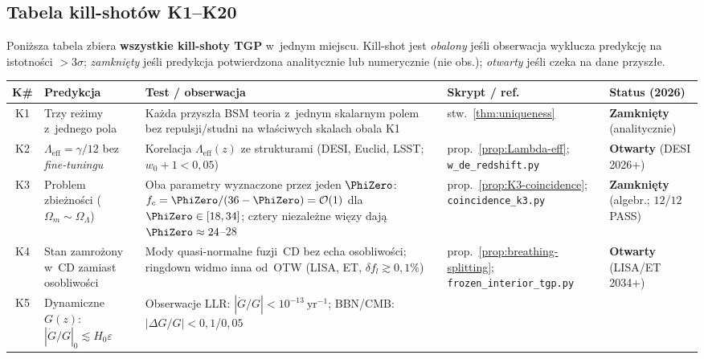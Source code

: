 \subsection{Tabela kill-shot\'ow K1--K20}\label{ssec:killshots}

Poni\.zsza tabela zbiera \textbf{wszystkie kill-shoty TGP} w~jednym miejscu.
Kill-shot jest \emph{obalony} je\'sli obserwacja wyklucza predykcj\k{e} na
istotno\'sci $>3\sigma$; \emph{zamkni\k{e}ty} je\'sli predykcja potwierdzona
analitycznie lub numerycznie (nie obs.); \emph{otwarty} je\'sli czeka na
dane przysz\l{}e.

\begin{center}
\small
\setlength{\tabcolsep}{4pt}
\begin{tabular}{@{}c>{\raggedright}p{3.1cm}p{4.4cm}p{2.0cm}p{2.0cm}@{}}
\toprule
\textbf{K\#} & \textbf{Predykcja} & \textbf{Test / obserwacja}
  & \textbf{Skrypt / ref.} & \textbf{Status (2026)} \\
\midrule
K1 & Trzy re\.zimy z~jednego pola
   & Ka\.zda przysz\l{}a BSM teoria z~jednym skalarnym polem
     bez repulsji/studni na w\l{}a\'sciwych skalach obala K1
   & stw.~\ref{thm:uniqueness}
   & \textbf{Zamkni\k{e}ty} (analitycznie) \\[3pt]
K2 & $\Lambda_{\mathrm{eff}} = \gamma/12$ bez \emph{fine-tuningu}
   & Korelacja $\Lambda_{\mathrm{eff}}(z)$ ze strukturami
     (DESI, Euclid, LSST; $w_0 + 1 < 0{,}05$)
   & prop.~\ref{prop:Lambda-eff}; \texttt{w\_de\_redshift.py}
   & \textbf{Otwarty} (DESI 2026+) \\[3pt]
K3 & Problem zbie\.zno\'sci ($\Omega_m \sim \Omega_\Lambda$)
   & Oba parametry wyznaczone przez jeden $\PhiZero$:
     $f_c = \PhiZero/(36-\PhiZero) = \mathcal{O}(1)$
     dla $\PhiZero \in [18, 34]$; cztery niezale\.zne
     wi\k{e}zy daj\k{a} $\PhiZero \approx 24$--$28$
   & prop.~\ref{prop:K3-coincidence};
     \texttt{coincidence\_k3.py}
   & \textbf{Zamkni\k{e}ty} (algebr.; $12/12$ PASS) \\[3pt]
K4 & Stan zamro\.zony w~CD zamiast osobliwo\'sci
   & Mody quasi-normalne fuzji~CD bez echa osobliwo\'sci;
     ringdown widmo inna od~OTW (LISA, ET, $\delta f_l \gtrsim 0{,}1\%$)
   & prop.~\ref{prop:breathing-splitting}; \texttt{frozen\_interior\_tgp.py}
   & \textbf{Otwarty} (LISA/ET 2034+) \\[3pt]
K5 & Dynamiczne $G(z)$: $|\dot G/G|_0 \lesssim H_0\varepsilon$
   & Obserwacje LLR: $|\dot G/G| < 10^{-13}\ \mathrm{yr}^{-1}$;
     BBN/CMB: $|\Delta G/G| < 0{,}1$/$0{,}05$

\end{tabular}
\end{center}
